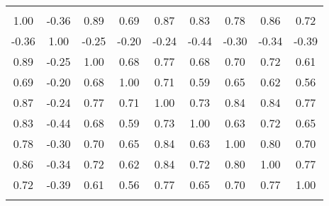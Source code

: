 \begin{tabular}{ccccccccc}
\hline\\

1.00 & -0.36 & 0.89 & 0.69 & 0.87 & 0.83 & 0.78 & 0.86 & 0.72 \\
-0.36 & 1.00 & -0.25 & -0.20 & -0.24 & -0.44 & -0.30 & -0.34 & -0.39 \\
0.89 & -0.25 & 1.00 & 0.68 & 0.77 & 0.68 & 0.70 & 0.72 & 0.61 \\
0.69 & -0.20 & 0.68 & 1.00 & 0.71 & 0.59 & 0.65 & 0.62 & 0.56 \\
0.87 & -0.24 & 0.77 & 0.71 & 1.00 & 0.73 & 0.84 & 0.84 & 0.77 \\
0.83 & -0.44 & 0.68 & 0.59 & 0.73 & 1.00 & 0.63 & 0.72 & 0.65 \\
0.78 & -0.30 & 0.70 & 0.65 & 0.84 & 0.63 & 1.00 & 0.80 & 0.70 \\
0.86 & -0.34 & 0.72 & 0.62 & 0.84 & 0.72 & 0.80 & 1.00 & 0.77 \\
0.72 & -0.39 & 0.61 & 0.56 & 0.77 & 0.65 & 0.70 & 0.77 & 1.00 \\

\hline\\
\end{tabular}
